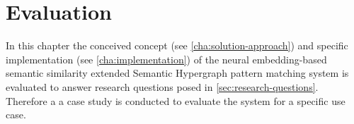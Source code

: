 \documentclass[11pt]{scrreprt}
\begin{document}
{%
%
%






\chapter{Evaluation}
\label{cha:evaluation}
In this chapter the conceived concept (see \cref{cha:solution-approach}) and specific implementation (see \cref{cha:implementation}) of the neural embedding-based semantic similarity extended Semantic Hypergraph pattern matching system is evaluated to answer research questions posed in \cref{sec:research-questions}.  Therefore a a case study is conducted to evaluate the system for a specific use case. 


}
\end{document}
